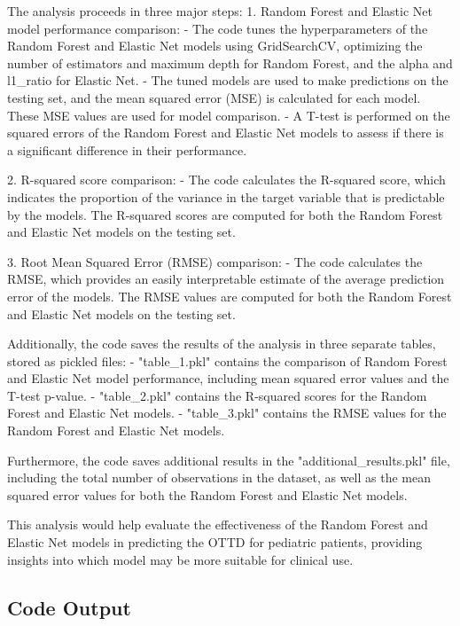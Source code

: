 \documentclass[11pt]{article}
\begin{document}
The analysis proceeds in three major steps:
1. Random Forest and Elastic Net model performance comparison:
   - The code tunes the hyperparameters of the Random Forest and Elastic Net models using GridSearchCV, optimizing the number of estimators and maximum depth for Random Forest, and the alpha and l1\_ratio for Elastic Net.
   - The tuned models are used to make predictions on the testing set, and the mean squared error (MSE) is calculated for each model. These MSE values are used for model comparison.
   - A T-test is performed on the squared errors of the Random Forest and Elastic Net models to assess if there is a significant difference in their performance.

2. R-squared score comparison:
   - The code calculates the R-squared score, which indicates the proportion of the variance in the target variable that is predictable by the models. The R-squared scores are computed for both the Random Forest and Elastic Net models on the testing set.

3. Root Mean Squared Error (RMSE) comparison:
   - The code calculates the RMSE, which provides an easily interpretable estimate of the average prediction error of the models. The RMSE values are computed for both the Random Forest and Elastic Net models on the testing set.

Additionally, the code saves the results of the analysis in three separate tables, stored as pickled files:
- "table\_1.pkl" contains the comparison of Random Forest and Elastic Net model performance, including mean squared error values and the T-test p-value.
- "table\_2.pkl" contains the R-squared scores for the Random Forest and Elastic Net models.
- "table\_3.pkl" contains the RMSE values for the Random Forest and Elastic Net models.

Furthermore, the code saves additional results in the "additional\_results.pkl" file, including the total number of observations in the dataset, as well as the mean squared error values for both the Random Forest and Elastic Net models.

This analysis would help evaluate the effectiveness of the Random Forest and Elastic Net models in predicting the OTTD for pediatric patients, providing insights into which model may be more suitable for clinical use.

\subsection{Code Output}
\end{document}
